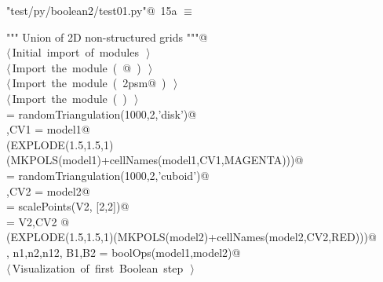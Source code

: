 \documentclass[11pt,oneside]{article}	%
\begin{document}
\begin{flushleft} \small
\begin{minipage}{\linewidth} \label{scrap26}
\protect{}\verb@"test/py/boolean2/test01.py"@\nobreak\ {\footnotesize 15a }$\equiv$
\vspace{-1ex}
\begin{list}{}{} \item
\mbox{}\verb@""" Union of 2D non-structured grids """@\\
\mbox{}\verb@@\hbox{$\langle\,$Initial import of modules\nobreak\ {\footnotesize {}}$\,\rangle$}\verb@@\\
\mbox{}\verb@@\hbox{$\langle\,$Import the module\nobreak\ ({\footnotesize {}\label{scrap27}
 }\mbox{}@ ) {\footnotesize {}}$\,\rangle$}\verb@@\\
\mbox{}\verb@@\hbox{$\langle\,$Import the module\nobreak\ ({\footnotesize {}\label{scrap28}
 }\mbox{}\verb@lar2psm@ ) {\footnotesize {}}$\,\rangle$}\verb@@\\
\mbox{}\verb@@\hbox{$\langle\,$Import the module\nobreak\ ({\footnotesize {}\label{scrap29}
 }\mbox{}\verb@myfont@ ) {\footnotesize {}}$\,\rangle$}\verb@@\\
\mbox{} = randomTriangulation(1000,2,'disk')@\\
\mbox{},CV1 = model1@\\
\mbox{}\verb@VIEW(EXPLODE(1.5,1.5,1)(MKPOLS(model1)+cellNames(model1,CV1,MAGENTA)))@\\
\mbox{} = randomTriangulation(1000,2,'cuboid')@\\
\mbox{},CV2 = model2@\\
\mbox{} = scalePoints(V2, [2,2])@\\
\mbox{} = V2,CV2 @\\
\mbox{}\verb@VIEW(EXPLODE(1.5,1.5,1)(MKPOLS(model2)+cellNames(model2,CV2,RED)))@\\
\mbox{}\verb@V, n1,n2,n12, B1,B2 = boolOps(model1,model2)@\\
\mbox{}\verb@@\hbox{$\langle\,$Visualization of first Boolean step\nobreak\ {\footnotesize {}}$\,\rangle$}\verb@@\\
\mbox{}\verb@@{\NWsep}
\end{list}
\vspace{-2ex}
\end{minipage}\\[4ex]
\end{flushleft}
\end{document}
